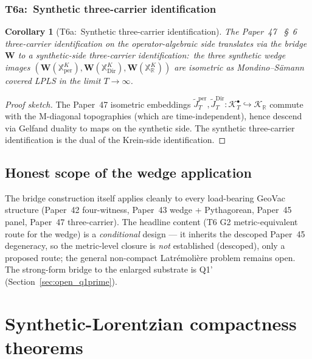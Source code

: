 \documentclass[11pt,a4paper]{article}
\theoremstyle{plain}
\newtheorem{corollary}[theorem]{Corollary}
\theoremstyle{definition}
\newcommand{\Krein}{\mathcal{K}}
\newcommand{\R}{\mathbb{R}}
\newcommand{\Wfun}{\mathbf{W}}
\begin{document}
\subsubsection{T6a:\ Synthetic three-carrier
identification}\label{sec:t6a_three_carrier_synthetic}

\begin{corollary}[T6a:\ Synthetic three-carrier
identification]\label{cor:three_carrier_synthetic}
The Paper~47~\cite{paper47} \S~6 three-carrier identification on the
operator-algebraic side translates via the bridge $\Wfun$ to a
synthetic-side three-carrier identification:\ the three synthetic
wedge images $(\Wfun(\mathbb{X}^{K}_{\mathrm{per}}),
\Wfun(\mathbb{X}^{K}_{\mathrm{Dir}}), \Wfun(\mathbb{X}^{K}_{\R}))$
are isometric as Mondino--S\"amann covered LPLS in the limit
$T \to \infty$.
\end{corollary}

\begin{proof}[Proof sketch]
The Paper~47 isometric embeddings $\widetilde{J}_{T}^{\mathrm{per}},
\widetilde{J}_{T}^{\mathrm{Dir}}: \Krein_{T}^{\bullet} \hookrightarrow
\Krein_{\R}$ commute with the M-diagonal topographies (which are
time-independent), hence descend via Gelfand duality to maps on the
synthetic side. The synthetic three-carrier identification is the
dual of the Krein-side identification.
\end{proof}

\subsection{Honest scope of the wedge application}\label{sec:wedge_scope}

The bridge construction itself
applies cleanly to every load-bearing GeoVac structure (Paper~42
four-witness, Paper~43 wedge + Pythagorean, Paper~45 panel, Paper~47
three-carrier). The headline content (T6 G2 metric-equivalent route
for the wedge) is a \emph{conditional} design --- it inherits the
descoped Paper~45 degeneracy, so the metric-level closure is
\emph{not} established (descoped), only a proposed route; the general
non-compact Latr\'emoli\`ere problem
remains open. The strong-form bridge to the enlarged substrate is
Q1' (Section~\ref{sec:open_q1prime}).

\section{Synthetic-Lorentzian compactness
theorems}\label{sec:compactness}
\end{document}
